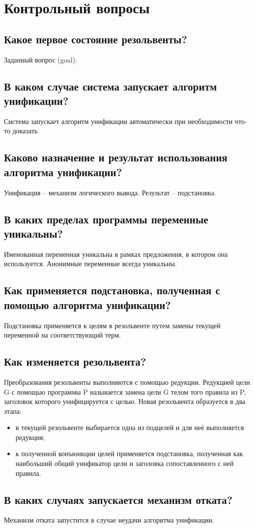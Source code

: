 \chapter{Контрольный вопросы}

\section{Какое первое состояние резольвенты?}

Заданный вопрос (goal).

\section{В каком случае система запускает алгоритм унификации?}

Система запускает алгоритм унификации автоматически при необходимости что-то доказать

\section{Каково назначение и результат использования алгоритма унификации?}

Унификация – механизм логического вывода. Результат – подстановка.

\section{В каких пределах программы переменные уникальны?}

Именованная переменная уникальна в рамках предложения, в котором она используется. Анонимные переменные всегда уникальны.

\section{Как применяется подстановка, полученная с помощью алгоритма унификации?}

Подстановка применяется к целям в резольвенте путем замены текущей переменной на соответствующий терм.

\section{Как изменяется резольвента?}

Преобразования резольвенты выполняются с помощью редукции. Редукцией цели G с помощью программы P называется замена цели G телом того правила из P, заголовок которого унифицируется с целью. Новая резольвента образуется в два этапа:
\begin{itemize}
    \item в текущей резольвенте выбирается одна из подцелей и для неё выполняется редукция;
    \item к полученной конъюнкции целей применяется подстановка, полученная как наибольший общий унификатор цели и заголовка сопоставленного с ней правила.
\end{itemize}

\section{В каких случаях запускается механизм отката?}

Механизм отката запустится в случае неудачи алгоритма унификации.